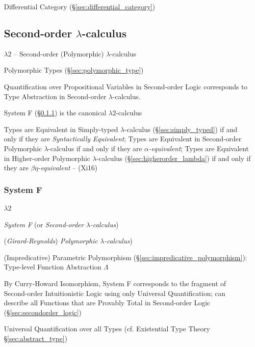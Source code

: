 \fist Differential Category (\S\ref{sec:differential_category})



\subsection{Second-order $\lambda$-calculus}
\label{sec:secondorder_lambda}

$\lambda2$ -- Second-order (Polymorphic) $\lambda$-calculus

Polymorphic Types (\S\ref{sec:polymorphic_type})

Quantification over Propositional Variables in Second-order Logic
corresponds to Type Abstraction in Second-order $\lambda$-calculus.
\cite{wadler14}

System F (\S\ref{sec:system_f}) is the canonical $\lambda2$-calculus


Types are Equivalent in Simply-typed $\lambda$-calculus
(\S\ref{sec:simply_typed}) if and only if they are \emph{Syntactically
  Equivalent}; Types are Equivalent in Second-order Polymorphic
$\lambda$-calculus if and only if they are \emph{$\alpha$-equivalent};
Types are Equivalent in Higher-order Polymorphic $\lambda$-calculus
(\S\ref{sec:higherorder_lambda}) if and only if they are
\emph{$\beta\eta$-equivalent} -- (Xi16)



\subsubsection{System F}\label{sec:system_f}

$\lambda2$

\emph{System F} (or \emph{Second-order $\lambda$-calculus})

(\emph{Girard-Reynolds}) \emph{Polymorphic $\lambda$-calculus})

(Impredicative) Parametric Polymorphism
(\S\ref{sec:impredicative_polymorphism}): Type-level Function
Abstraction $\Lambda$

By Curry-Howard Isomorphism, System F corresponds to the fragment of
Second-order Intuitionistic Logic using only Universal Quantification;
can describe all Functions that are Provably Total in Second-order
Logic (\S\ref{sec:secondorder_logic})

Universal Quantification over all Types (cf. Existential Type Theory
\S\ref{sec:abstract_type}) %



